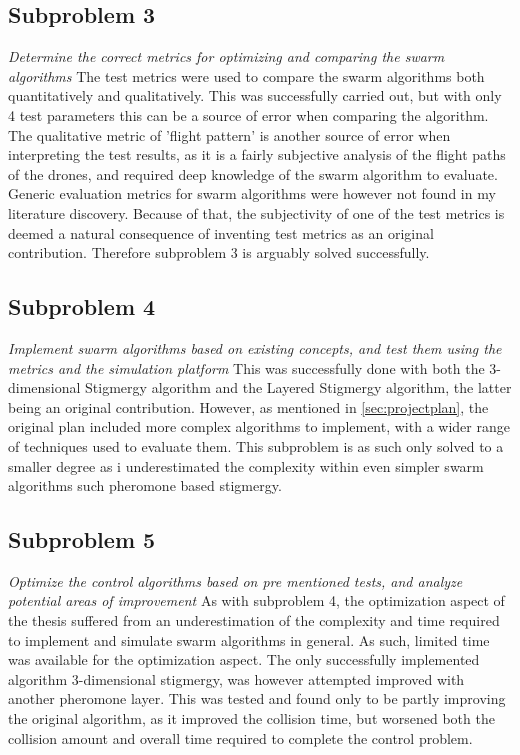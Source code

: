 \subsection{Subproblem 3}
\textit{Determine the correct metrics for optimizing and comparing the swarm algorithms}
The test metrics were used to compare the swarm algorithms both quantitatively and qualitatively. This was successfully carried out, but with only 4 test parameters this can be a source of error when comparing the algorithm. The qualitative metric of 'flight pattern' is another source of error when interpreting the test results, as it is a fairly subjective analysis of the flight paths of the drones, and required deep knowledge of the swarm algorithm to evaluate. Generic evaluation metrics for swarm algorithms were however not found in my literature discovery. Because of that, the subjectivity of one of the test metrics is deemed a natural consequence of inventing test metrics as an original contribution. Therefore subproblem 3 is arguably solved successfully. 


\subsection{Subproblem 4}
\textit{Implement swarm algorithms based on existing concepts, and test them using the metrics and the simulation platform}
This was successfully done with both the 3-dimensional Stigmergy algorithm and the Layered Stigmergy algorithm, the latter being an original contribution. However, as mentioned in \ref{sec:projectplan}, the original plan included more complex algorithms to implement, with a wider range of techniques used to evaluate them. This subproblem is as such only solved to a smaller degree as i underestimated the complexity within even simpler swarm algorithms such pheromone based stigmergy. 

\subsection{Subproblem 5}
\textit{Optimize the control algorithms based on pre mentioned tests, and analyze potential areas of improvement}
As with subproblem 4, the optimization aspect of the thesis suffered from an underestimation of the complexity and time required to implement and simulate swarm algorithms in general. As such, limited time was available for the optimization aspect. The only successfully implemented algorithm 3-dimensional stigmergy, was however attempted improved with another pheromone layer. This was tested and found only to be partly improving the original algorithm, as it improved the collision time, but worsened both the collision amount and overall time required to complete the control problem.


